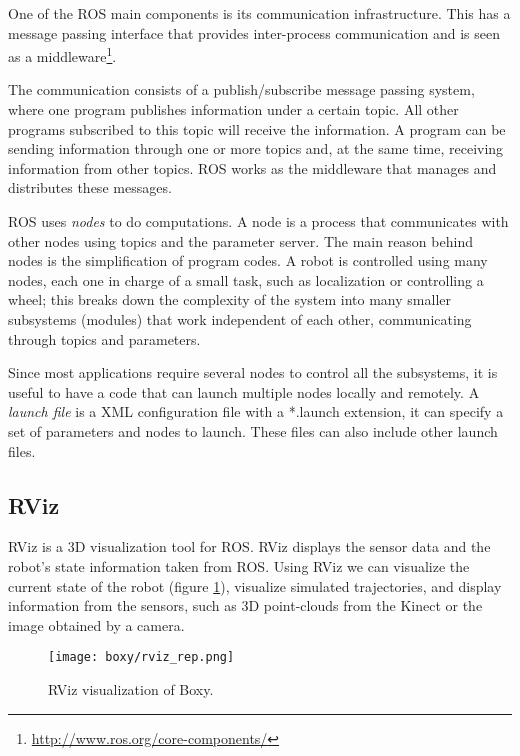One of the ROS main components is its communication infrastructure. This has a message passing interface that provides inter-process communication and is seen as a middleware\footnote{\url{http://www.ros.org/core-components/}}. 

The communication consists of a publish/subscribe message passing system, where one program publishes information under a certain topic. All other programs subscribed to this topic will receive the information. A program can be sending information through one or more topics and, at the same time, receiving information from other topics. ROS works as the middleware that manages and distributes these messages.

ROS uses \textit{nodes} to do computations. A node is a process that communicates with other nodes using topics and the parameter server. The main reason behind nodes is the simplification of program codes. A robot is controlled using many nodes, each one in charge of a small task, such as localization or controlling a wheel; this breaks down the complexity of the system into many smaller subsystems (modules) that work independent of each other, communicating through topics and parameters.

Since most applications require several nodes to control all the subsystems, it is useful to have a code that can launch multiple nodes locally and remotely. A \textit{launch file} is a XML configuration file with a *.launch extension, it can specify a set of parameters and nodes to launch. These files can also include other launch files. 


\subsection{RViz}
\label{subsec:rviz}

RViz is a 3D visualization tool for ROS. RViz displays the sensor data and the robot's state information taken from ROS. Using RViz we can visualize the current state of the robot (figure \ref{fig:rviz}), visualize simulated trajectories, and display information from the sensors, such as 3D point-clouds from the Kinect or the image obtained by a camera.

\begin{figure}[H]
	\centering
	\texttt{[image: boxy/rviz\_rep.png]}
	\vspace{-10pt}
	\caption{RViz visualization of Boxy.}
	\vspace{-15pt}
	\label{fig:rviz}
\end{figure}

